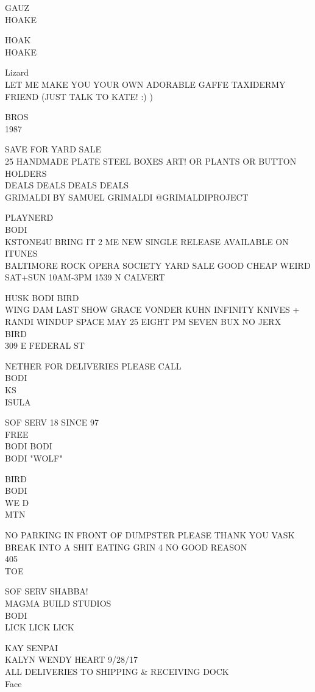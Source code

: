 \documentclass[10pt,letterpaper]{article}
\begin{document}
GAUZ\\
HOAKE

HOAK\\
HOAKE

Lizard\\
LET ME MAKE YOU YOUR OWN ADORABLE GAFFE TAXIDERMY FRIEND (JUST TALK TO KATE! :) )

BROS\\
1987

SAVE FOR YARD SALE\\
25 HANDMADE PLATE STEEL BOXES ART!  OR PLANTS OR BUTTON HOLDERS\\
DEALS DEALS DEALS DEALS\\
GRIMALDI BY SAMUEL GRIMALDI @GRIMALDIPROJECT

PLAYNERD\\
BODI\\
KSTONE4U BRING IT 2 ME NEW SINGLE RELEASE AVAILABLE ON ITUNES\\
BALTIMORE ROCK OPERA SOCIETY YARD SALE GOOD CHEAP WEIRD SAT+SUN 10AM{-}3PM 1539 N CALVERT

HUSK BODI BIRD\\
WING DAM LAST SHOW GRACE VONDER KUHN INFINITY KNIVES + RANDI WINDUP SPACE MAY 25 EIGHT PM SEVEN BUX NO JERX\\
BIRD\\
309 E FEDERAL ST

NETHER FOR DELIVERIES PLEASE CALL\\
BODI\\
KS\\
ISULA

SOF SERV 18 SINCE 97\\
FREE\\
BODI BODI\\
BODI "WOLF"

BIRD\\
BODI\\
WE D\\
MTN

NO PARKING IN FRONT OF DUMPSTER PLEASE THANK YOU VASK\\
BREAK INTO A SHIT EATING GRIN 4 NO GOOD REASON\\
405\\
TOE

SOF SERV SHABBA!\\
MAGMA BUILD STUDIOS\\
BODI\\
LICK LICK LICK

KAY SENPAI\\
KALYN WENDY HEART 9/28/17\\
ALL DELIVERIES TO SHIPPING \& RECEIVING DOCK\\
Face
\end{document}
